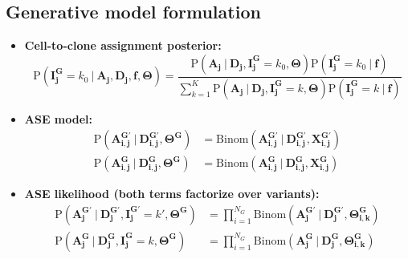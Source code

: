 \documentclass[11pt,a4paper,fullpage]{article}
\def\P{\mathrm{P}}
\theoremstyle{definition}
\theoremstyle{definition}
\theoremstyle{definition}
\numberwithin{equation}{section}
\begin{document}
	\subsection{Generative model formulation}
	\begin{itemize}
		\item \textbf{Cell-to-clone assignment posterior:}
		\begin{equation}
		\P(\mathbf{I^{G}_{j}} = k_{0} \ |\  \mathbf{A_{j}}, \mathbf{D_{j}}, \mathbf{f}, \mathbf{\Theta}) =  
		\dfrac{\P(\mathbf{A_j} \ |\  \mathbf{D_j}, \mathbf{I^{G}_{j}} = k_{0}, \mathbf{\Theta}) \P(\mathbf{I^{G}_{j}} = k_{0} \ |\  \textbf{f}) }{\sum\limits_{k=1}^{K}\P(\mathbf{A_j} \ |\  \mathbf{D_j}, \mathbf{I^{G}_{j}} = k, \mathbf{\Theta}) \P(\mathbf{I^{G}_{j}} = k\ |\  \textbf{f}) }
		\end{equation}
		
		\item \textbf{ASE model:}
		\begin{equation}
		\begin{aligned}
		\P(\mathbf{A^{G'}_{i,j}}\ |\ \mathbf{D^{G'}_{i,j}}, \mathbf{\Theta^{G}}) &= \mathrm{Binom}(\mathbf{A^{G'}_{i,j}}\ |\ \mathbf{D^{G'}_{i,j}}, \mathbf{X^{G'}_{i,j}})\\
		\P(\mathbf{A^{G}_{i,j}}\ |\ \mathbf{D^{G}_{i,j}}, \mathbf{\Theta^{G}}) &= \mathrm{Binom}(\mathbf{A^{G}_{i,j}}\ |\ \mathbf{D^{G}_{i,j}}, \mathbf{X^{G}_{i,j}}) 
		\end{aligned}
		\end{equation}
		
		\item \textbf{ASE likelihood (both terms factorize over variants):}
		\begin{equation}
		\begin{aligned}
		\P(\mathbf{A^{G'}_{j}}\ |\ \mathbf{D^{G'}_{j}}, \mathbf{I^{G'}_{j}} = k', \mathbf{\Theta^{G}}) &= \prod_{i=1}^{N_{G}} \mathrm{Binom}(\mathbf{A^{G'}_{j}}\ |\ \mathbf{D^{G'}_{j}}, \mathbf{\Theta^{G}_{i, k}})\\
		\P(\mathbf{A^{G}_{j}}\ |\ \mathbf{D^{G}_{j}}, \mathbf{I^{G}_{j}} = k, \mathbf{\Theta^{G}}) &= \prod_{i=1}^{N_{G}} \mathrm{Binom}(\mathbf{A^{G}_{j}}\ |\ \mathbf{D^{G}_{j}}, \mathbf{\Theta^{G}_{i, k}})
		\end{aligned}
		\end{equation}
		

\end{itemize}
\end{document}
